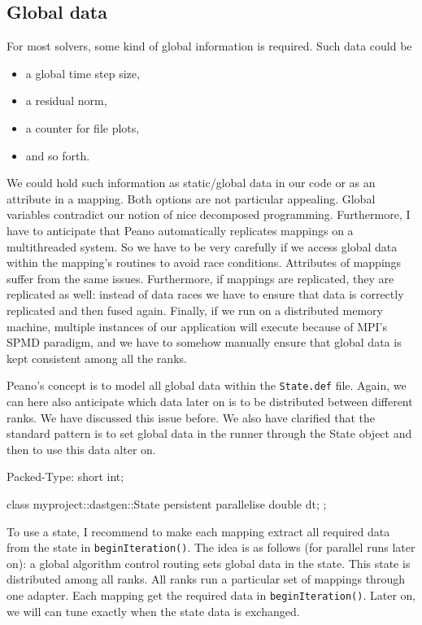 \subsection{Global data}

For most solvers, some kind of global information is required. 
Such data could be 
\begin{itemize}
  \item a global time step size,
  \item a residual norm,
  \item a counter for file plots, 
  \item and so forth.
\end{itemize}

\noindent
We could hold such information as static/global data in our code or as an
attribute in a mapping. 
Both options are not particular appealing. 
Global variables contradict our notion of nice decomposed programming.
Furthermore, I have to anticipate that Peano automatically replicates mappings
on a multithreaded system. 
So we have to be very carefully if we access global data within the mapping's
routines to avoid race conditions.
Attributes of mappings suffer from the same issues.
Furthermore, if mappings are replicated, they are replicated as well: 
instead of data races we have to ensure that data is correctly replicated and
then fused again. 
Finally, if we run on a distributed memory machine, multiple instances of our
application will execute because of MPI's SPMD paradigm, and we have to somehow
manually ensure that global data is kept consistent among all the ranks.


Peano's concept is to model all global data within the \texttt{State.def} file. 
Again, we can here also anticipate which data later on is to be distributed
between different ranks. We have discussed this issue before.
We also have clarified that the standard pattern is to set global data in the
runner through the State object and then to use this data alter on.

\begin{code}
Packed-Type: short int;


class myproject::dastgen::State {  
  persistent parallelise double dt;
};

\end{code}

To use a state, I recommend to make each mapping extract all required data from
the state in \texttt{beginIteration()}.
The idea is as follows (for parallel runs later on): a global algorithm control
routing sets global data in the state.
This state is distributed among all ranks.
All ranks run a particular set of mappings through one adapter.
Each mapping get the required data in \texttt{beginIteration()}.
Later on, we will can tune exactly when the state data is exchanged.

